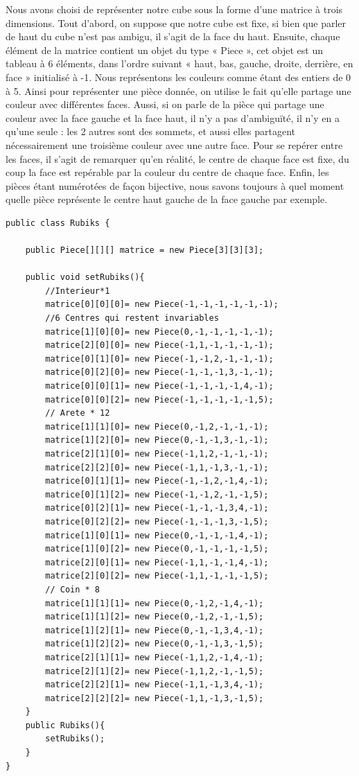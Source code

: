 \documentclass[a4paper,11pt]{article}
\theoremstyle{mytheor}
\begin{document}
Nous avons choisi de représenter notre cube sous la forme d'une matrice à trois dimensions. Tout d'abord, on suppose que notre cube est fixe, si bien que parler de haut du cube n'est pas ambigu, il s'agit de la face du haut. Ensuite, chaque élément de la matrice contient un objet du type « Piece », cet objet est un tableau à 6 éléments, dans l'ordre suivant « haut, bas, gauche, droite, derrière, en face » initialisé à -1. Nous représentons les couleurs comme étant des entiers de 0 à 5. Ainsi pour représenter une pièce donnée, on utilise le fait qu'elle partage une couleur avec différentes faces. Aussi, si on parle de la pièce qui partage une couleur avec la face gauche et la face haut, il n'y a pas d'ambiguïté, il n'y en a qu'une seule : les 2 autres sont des sommets, et aussi elles partagent nécessairement une troisième couleur avec une autre face. Pour se repérer entre les faces, il s'agit de remarquer qu'en réalité, le centre de chaque face est fixe, du coup la face est repérable par la couleur du centre de chaque face. Enfin, les pièces étant numérotées de façon bijective, nous savons toujours à quel moment quelle pièce représente le centre haut gauche de la face gauche par exemple.


\begin{lstlisting}[label={list:first},caption=La classe du notre Rubik's cube.]
public class Rubiks {
	
	public Piece[][][] matrice = new Piece[3][3][3];
	
	public void setRubiks(){
		//Interieur*1
		matrice[0][0][0]= new Piece(-1,-1,-1,-1,-1,-1);
		//6 Centres qui restent invariables
		matrice[1][0][0]= new Piece(0,-1,-1,-1,-1,-1);
		matrice[2][0][0]= new Piece(-1,1,-1,-1,-1,-1);
		matrice[0][1][0]= new Piece(-1,-1,2,-1,-1,-1);
		matrice[0][2][0]= new Piece(-1,-1,-1,3,-1,-1);
		matrice[0][0][1]= new Piece(-1,-1,-1,-1,4,-1);
		matrice[0][0][2]= new Piece(-1,-1,-1,-1,-1,5);
		// Arete * 12
		matrice[1][1][0]= new Piece(0,-1,2,-1,-1,-1);
		matrice[1][2][0]= new Piece(0,-1,-1,3,-1,-1);
		matrice[2][1][0]= new Piece(-1,1,2,-1,-1,-1);
		matrice[2][2][0]= new Piece(-1,1,-1,3,-1,-1);
		matrice[0][1][1]= new Piece(-1,-1,2,-1,4,-1);
		matrice[0][1][2]= new Piece(-1,-1,2,-1,-1,5);
		matrice[0][2][1]= new Piece(-1,-1,-1,3,4,-1);
		matrice[0][2][2]= new Piece(-1,-1,-1,3,-1,5);
		matrice[1][0][1]= new Piece(0,-1,-1,-1,4,-1);
		matrice[1][0][2]= new Piece(0,-1,-1,-1,-1,5);
		matrice[2][0][1]= new Piece(-1,1,-1,-1,4,-1);
		matrice[2][0][2]= new Piece(-1,1,-1,-1,-1,5);
		// Coin * 8
		matrice[1][1][1]= new Piece(0,-1,2,-1,4,-1);
		matrice[1][1][2]= new Piece(0,-1,2,-1,-1,5);
		matrice[1][2][1]= new Piece(0,-1,-1,3,4,-1);
		matrice[1][2][2]= new Piece(0,-1,-1,3,-1,5);
		matrice[2][1][1]= new Piece(-1,1,2,-1,4,-1);
		matrice[2][1][2]= new Piece(-1,1,2,-1,-1,5);
		matrice[2][2][1]= new Piece(-1,1,-1,3,4,-1);
		matrice[2][2][2]= new Piece(-1,1,-1,3,-1,5);
	}
	public Rubiks(){
		setRubiks();
	}
}	
\end{lstlisting}
\end{document}
